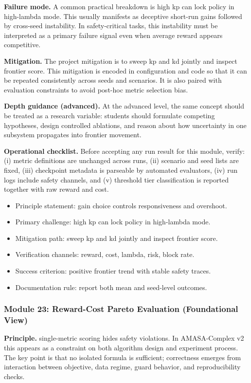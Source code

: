 \documentclass[conference]{IEEEtran}
\begin{document}
\textbf{Failure mode.} A common practical breakdown is high kp can lock policy in high-lambda mode. This usually manifests as deceptive short-run gains followed by cross-seed instability. In safety-critical tasks, this instability must be interpreted as a primary failure signal even when average reward appears competitive.

\textbf{Mitigation.} The project mitigation is to sweep kp and kd jointly and inspect frontier score. This mitigation is encoded in configuration and code so that it can be repeated consistently across seeds and scenarios. It is also paired with evaluation constraints to avoid post-hoc metric selection bias.

\textbf{Depth guidance (advanced).} At the advanced level, the same concept should be treated as a research variable: students should formulate competing hypotheses, design controlled ablations, and reason about how uncertainty in one subsystem propagates into frontier movement.

\textbf{Operational checklist.} Before accepting any run result for this module, verify: (i) metric definitions are unchanged across runs, (ii) scenario and seed lists are fixed, (iii) checkpoint metadata is parseable by automated evaluators, (iv) run logs include safety channels, and (v) threshold tier classification is reported together with raw reward and cost.

\begin{itemize}[leftmargin=*]
  \item Principle statement: gain choice controls responsiveness and overshoot.
  \item Primary challenge: high kp can lock policy in high-lambda mode.
  \item Mitigation path: sweep kp and kd jointly and inspect frontier score.
  \item Verification channels: reward, cost, lambda, risk, block rate.
  \item Success criterion: positive frontier trend with stable safety traces.
  \item Documentation rule: report both mean and seed-level outcomes.
\end{itemize}


\subsubsection{Module 23: Reward-Cost Pareto Evaluation (Foundational View)}
\textbf{Principle.} single-metric scoring hides safety violations. In AMASA-Complex v2 this appears as a constraint on both algorithm design and experiment process. The key point is that no isolated formula is sufficient; correctness emerges from interaction between objective, data regime, guard behavior, and reproducibility checks.
\end{document}
